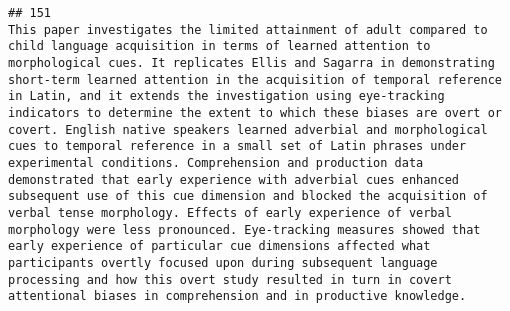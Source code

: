 \documentclass[
  english,
  man]{apa6}
\begin{document}
\begin{verbatim}
## 151                                                                                                                                                                                                                                                                                                                                                                                                                                                                                                                                                                                                                                                                                                                                                                                                                                                                                                                                                                                                                                                                                                                                                                                                                                                                                                                                                                                                                                                                                                                            This paper investigates the limited attainment of adult compared to child language acquisition in terms of learned attention to morphological cues. It replicates Ellis and Sagarra in demonstrating short-term learned attention in the acquisition of temporal reference in Latin, and it extends the investigation using eye-tracking indicators to determine the extent to which these biases are overt or covert. English native speakers learned adverbial and morphological cues to temporal reference in a small set of Latin phrases under experimental conditions. Comprehension and production data demonstrated that early experience with adverbial cues enhanced subsequent use of this cue dimension and blocked the acquisition of verbal tense morphology. Effects of early experience of verbal morphology were less pronounced. Eye-tracking measures showed that early experience of particular cue dimensions affected what participants overtly focused upon during subsequent language processing and how this overt study resulted in turn in covert attentional biases in comprehension and in productive knowledge.

\end{verbatim}
\end{document}
